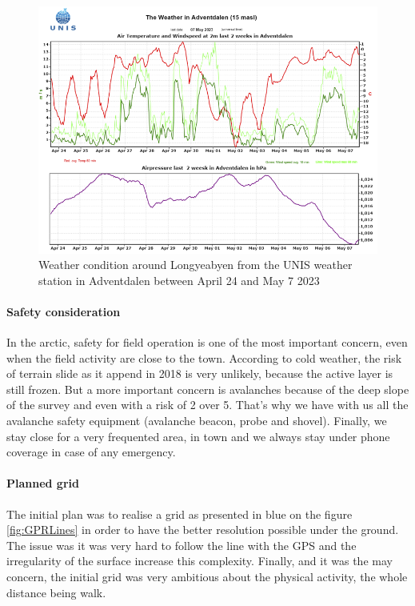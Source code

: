 \begin{figure}
    \centering
    \includegraphics[width=\linewidth]{Images/00_Methodology/WeatherConditions.png}
    \caption{Weather condition around Longyeabyen from the UNIS weather station in Adventdalen between April 24 and May 7 2023}
    \label{fig:weather}
\end{figure}

\paragraph{Safety consideration} In the arctic, safety for field operation is one of the most important concern, even when the field activity are close to the town. According to cold weather, the risk of terrain slide as it append in 2018 is very unlikely, because the active layer is still frozen. But a more important concern is avalanches because of the deep slope of the survey and even with a risk of 2 over 5. That's why we have with us all the avalanche safety equipment (avalanche beacon, probe and shovel).
Finally, we stay close for a very frequented area, in town and we always stay under phone coverage in case of any emergency.

\paragraph{Planned grid}

The initial plan was to realise a grid as presented in blue on the figure \ref{fig:GPRLines} in order to have the better resolution possible under the ground. The issue was it was very hard to follow the line with the GPS and the irregularity of the surface increase this complexity. Finally, and it was the may concern, the initial grid was very ambitious about the physical activity, the whole distance being walk. 

